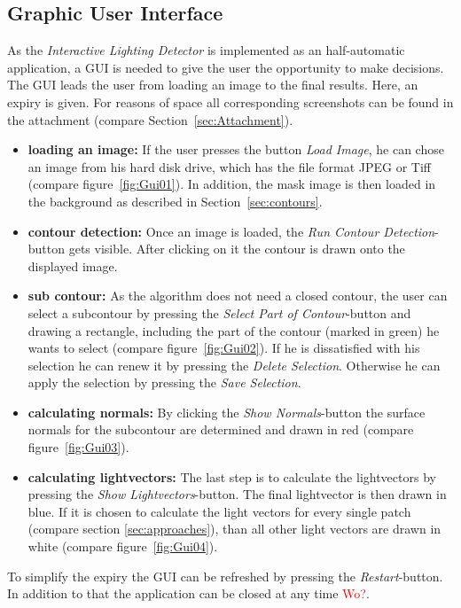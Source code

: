 \subsection{Graphic User Interface} \label{sec:GUI}

As the \textit{Interactive Lighting Detector} is implemented as an half-automatic application, a GUI is needed to give the user the opportunity to make decisions. The GUI leads the user from loading an image to the final results. Here, an expiry is given. For reasons of space all corresponding screenshots can be found in the attachment (compare Section~\ref{sec:Attachment}).  
\begin{itemize}
\item \textbf{loading an image:} If the user presses the button \textit{Load Image}, he can chose an image from his hard disk drive, which has the file format JPEG or Tiff (compare figure~\ref{fig:Gui01}). In addition, the mask image is then loaded in the background as described in Section~\ref{sec:contours}.
\item \textbf{contour detection:} Once an image is loaded, the \textit{Run Contour Detection}-button gets visible. After clicking on it the contour is drawn onto the displayed image.
\item \textbf{sub contour:} As the algorithm does not need a closed contour, the user can select a subcontour by pressing the \textit{Select Part of Contour}-button and drawing a rectangle, including the part of the contour (marked in green) he wants to select (compare figure~\ref{fig:Gui02}). If he is dissatisfied with his selection he can renew it by pressing the \textit{Delete Selection}. Otherwise he can apply the selection by pressing the \textit{Save Selection}. 
\item \textbf{calculating normals:} By clicking the \textit{Show Normals}-button the surface normals for the subcontour are determined and drawn in red (compare figure~\ref{fig:Gui03}).
\item \textbf{calculating lightvectors:} The last step is to calculate the lightvectors by pressing the \textit{Show Lightvectors}-button. The final lightvector is then drawn in blue. If it is chosen to calculate the light vectors for every single patch (compare section \ref{sec:approaches}), than all other light vectors are drawn in white (compare figure~\ref{fig:Gui04}). 
\end{itemize}

To simplify the expiry the GUI can be refreshed by pressing the \textit{Restart}-button. In addition to that the application can be closed at any time \textcolor{red}{Wo?}. 


\newpage